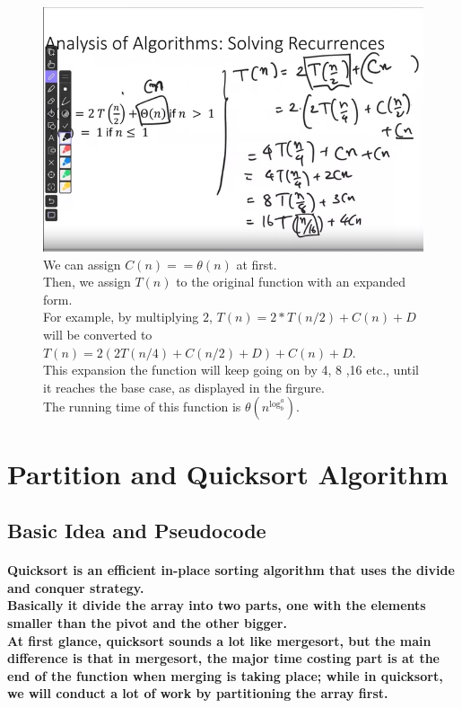 \documentclass{article}
\begin{document}
\begin{figure}[h!]
    \includegraphics[width=\textwidth]{expansionmethod.png}
    \caption{We can assign $C(n) == \theta(n)$ at first.\\
    Then, we assign $T(n)$ to the original function with an expanded form.\\
    For example, by multiplying $2$, $T(n) = 2*T(n/2) + C(n) + D$ will be converted to $T(n) = 2(2T(n/4) + C(n/2) + D) + C(n) +D$.\\
    This expansion the function will keep going on by 4, 8 ,16 etc., until it reaches the base case, as displayed in the firgure.\\
    The running time of this function is $\theta(n^{\log_b^a})$.\\}
\end{figure}

\section{Partition and Quicksort Algorithm}

\subsection{Basic Idea and Pseudocode}

\paragraph{Quicksort is an efficient in-place sorting algorithm that uses the divide and conquer strategy.\\
Basically it divide the array into two parts, one with the elements smaller than the pivot and the other bigger.\\
At first glance, quicksort sounds a lot like mergesort, but the main difference is that in mergesort, the major time costing part is
 at the end of the function when merging is taking place; while in quicksort, we will conduct a lot of work by partitioning the array first.\\}
\end{document}
